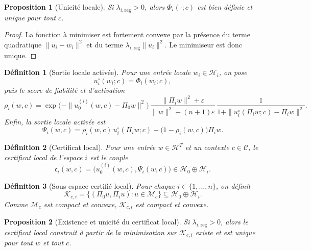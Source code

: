 \documentclass[11pt,a4paper]{article}
\newtheorem{definition}{Définition}[section]
\newtheorem{proposition}{Proposition}[section]
\newtheorem{remark}{Remarque}[section]
\newcommand{\C}{\mathcal C}
\newcommand{\Hh}{\mathcal H}
\newcommand{\Mcal}{\mathcal M}
\newcommand{\1}{\mathbf 1}
\begin{document}
\begin{proposition}[Unicité locale]
Si \(\lambda_{i,\mathrm{reg}}>0\), alors \(\Phi_i(\cdot;c)\) est bien définie et unique pour tout \(c\).
\end{proposition}

\begin{proof}
La fonction à minimiser est fortement convexe par la présence du terme quadratique \(\|u_i-w_i\|^2\) et du terme \(\lambda_{i,\mathrm{reg}}\|u_i\|^2\).  
Le minimiseur est donc unique.
\end{proof}

\begin{definition}[Sortie locale activée]
Pour une entrée locale \(w_i\in\Hh_i\), on pose
\[
u_i^\circ(w_i;c)=\Phi_i(w_i;c),
\]
puis le score de fiabilité et d'activation
\[
\rho_i(w,c)
=
\exp\!\bigl(-\|u_0^{(i)}(w,c)-\Pi_0 w\|^2\bigr)\,
\frac{\|\Pi_i w\|^2+\varepsilon}{\|w\|^2+(n+1)\varepsilon}\,
\frac{1}{1+\|u_i^\circ(\Pi_i w;c)-\Pi_i w\|^2}.
\]
Enfin, la sortie locale activée est
\[
\Psi_i(w,c)
=
\rho_i(w,c)\,u_i^\circ(\Pi_i w;c)
+
\bigl(1-\rho_i(w,c)\bigr)\Pi_i w.
\]
\end{definition}


\begin{definition}[Certificat local]
Pour une entrée \(w\in\Hh^T\) et un contexte \(c\in\C\), le certificat local de l'espace \(i\) est le couple
\[
\mathfrak c_i(w,c)=\bigl(u_0^{(i)}(w,c),\Psi_i(w,c)\bigr)\in \Hh_0\oplus \Hh_i.
\]
\end{definition}

\begin{definition}[Sous-espace certifié local]
Pour chaque \(i\in\{1,\dots,n\}\), on définit
\[
\mathcal K_{c,i}
=
\{(\Pi_0 u,\Pi_i u): u\in \Mcal_c\}
\subseteq \Hh_0\oplus \Hh_i.
\]
Comme \(\Mcal_c\) est compact et convexe, \(\mathcal K_{c,i}\) est compact et convexe.
\end{definition}

\begin{proposition}[Existence et unicité du certificat local]
Si \(\lambda_{i,\mathrm{reg}}>0\), alors le certificat local construit à partir de la minimisation sur \(\mathcal K_{c,i}\) existe et est unique pour tout \(w\) et tout \(c\).
\end{proposition}
\end{document}
